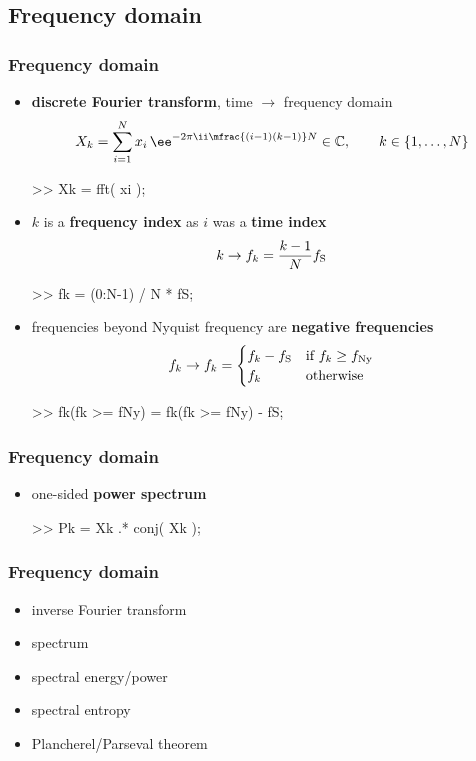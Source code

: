 
\subsection{Frequency domain}

\begin{frame}[fragile]
	\frametitle{Frequency domain}
	\begin{itemize}
		\item \textbf{discrete Fourier transform}, time $\rightarrow$ frequency domain
			\begin{align*}
				X_k=\sum_{i=1}^Nx_i\,\ee^{-2\pi\ii\mfrac{(i-1)(k-1)}N}\in\mathbb C,\qquad k\in\{1,\ldots,N\}
			\end{align*}
			\begin{code}
>> Xk = fft( xi );
			\end{code}
		\item $k$ is a \textbf{frequency index} as $i$ was a \textbf{time index}
			\begin{align*}
				k\rightarrow f_k=\frac{k-1}Nf_{\textrm S}
			\end{align*}
			\begin{code}
>> fk = (0:N-1) / N * fS;
			\end{code}
		\item frequencies beyond Nyquist frequency are \textbf{negative frequencies}
			\begin{align*}
				f_k\rightarrow f_k=\begin{cases}f_k-f_{\textrm S}&\textrm{if $f_k\ge f_{\textrm{Ny}}$}\\f_k&\textrm{otherwise}\end{cases}
			\end{align*}
			\begin{code}
>> fk(fk >= fNy) = fk(fk >= fNy) - fS;
			\end{code}
	\end{itemize}
\end{frame}

\begin{frame}[fragile]
	\frametitle{Frequency domain}
	\begin{itemize}
		\item one-sided \textbf{power spectrum}
			\begin{code}
>> Pk = Xk .* conj( Xk );
			\end{code}
	\end{itemize}
\end{frame}

\begin{frame}
	\frametitle{Frequency domain}
	\begin{itemize}
		\item inverse Fourier transform
		\item spectrum
		\item spectral energy/power
		\item spectral entropy
		\item Plancherel/Parseval theorem
	\end{itemize}
\end{frame}

